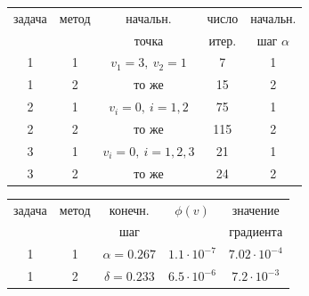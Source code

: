 {\begin{center} 


\begin{tabular}{|c|c|c|c|c|} 


\hline 


задача & метод & начальн. & число & начальн.\\ 


\ & \ & точка & итер. & шаг $\alpha$\\ 


\hline 


1 & 1 & $v_1=3,\ v_2=1$ & 7 & 1 \\ 


\hline 


1 & 2 & то же & 15 & 2 \\ 


\hline 


2 & 1 & $v_i=0,\ i=1,2$ & 75 & 1 \\ 


\hline 


2 & 2 & то же & 115 & 2 \\ 


\hline 


3 & 1 & $v_i=0,\ i=1,2,3$ & 21 & 1 \\ 


\hline 


3 & 2 & то же & 24 & 2 \\ 


\hline 


\end{tabular} 


\medskip 


 


\begin{tabular}{|c|c|c|c|c|} 


\hline 


задача & метод & конечн. & $\phi(v)$ & значение\\ 


\ & \ & шаг & \ & градиента\\ 


\hline 


1 & 1 & $\alpha=0.267$ & $1.1\cdot10^{-7}$ & $7.02\cdot10^{-4}$\\ 


\hline 


1 & 2 & $\delta=0.233$ & $6.5\cdot10^{-6}$ & $7.2\cdot10^{-3}$\\ 


\hline 



\end{tabular}
\end{center}}
